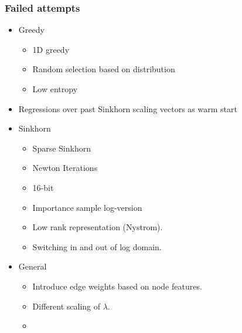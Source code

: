 \documentclass{article}
\begin{document}
\subsubsection{Failed attempts}
\begin{itemize}
    \item Greedy
    \begin{itemize}
        \item 1D greedy
        \item Random selection based on distribution
        \item Low entropy
    \end{itemize}
    \item Regressions over past Sinkhorn scaling vectors as warm start

    \item Sinkhorn
    \begin{itemize}
        \item Sparse Sinkhorn
        \item Newton Iterations
        \item 16-bit
        \item Importance sample log-version
        \item Low rank representation (Nystrom).
        \item Switching in and out of log domain.
    \end{itemize}

    \item General
    \begin{itemize}
        \item Introduce edge weights based on node features.
        \item Different scaling of $\lambda$.
        \item 
    \end{itemize}
    
\end{itemize}

\newpage


\end{document}

